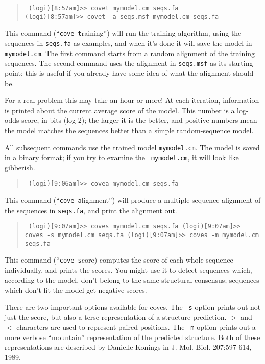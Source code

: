 \begin{quotation}
{\tt
(logi)[8:57am]>> covet mymodel.cm seqs.fa\\
(logi)[8:57am]>> covet -a seqs.msf mymodel.cm seqs.fa 
}
\end{quotation}

This command (``{\tt cove t}raining'') will run the training
algorithm, using the sequences in {\tt seqs.fa} as examples, and when
it's done it will save the model in {\tt mymodel.cm}. The first
command starts from a random alignment of the training sequences. The
second command uses the alignment in {\tt seqs.msf} as its starting
point; this is useful if you already have some idea of what the
alignment should be.

For a real problem this may take an hour or more! At each iteration,
information is printed about the current average score of the model.
This number is a log-odds score, in bits (log 2); the larger it is the
better, and positive numbers mean the model matches the sequences
better than a simple random-sequence model. 

All subsequent commands use the trained model {\tt mymodel.cm}. The
model is saved in a binary format; if you try to examine the {\tt
mymodel.cm}, it will look like gibberish.

\begin{quotation}
{\tt
(logi)[9:06am]>> covea mymodel.cm seqs.fa
}
\end{quotation}

This command (``{\tt cove a}lignment'') will produce a multiple
sequence alignment of the sequences in {\tt seqs.fa}, and print the
alignment out.

\begin{quotation}
{\tt
(logi)[9:07am]>> coves mymodel.cm seqs.fa
(logi)[9:07am]>> coves -s mymodel.cm seqs.fa
(logi)[9:07am]>> coves -m mymodel.cm seqs.fa
}
\end{quotation}

This command (``{\tt cove s}core) computes the score of
each whole sequence individually, and prints the scores.  You might
use it to detect sequences which, according to the model, don't belong
to the same structural consensus; sequences which don't fit the model
get negative scores.

There are two important options available for coves. The {\tt -s}
option prints out not just the score, but also a terse representation
of a structure prediction. $>$ and $<$ characters are used to
represent paired positions. The {\tt -m} option prints out a more
verbose ``mountain'' representation of the predicted structure.
Both of these representations are described by Danielle Konings in
J. Mol. Biol. 207:597-614, 1989.

